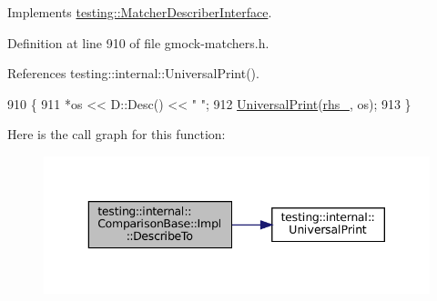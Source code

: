 Implements \hyperlink{classtesting_1_1MatcherDescriberInterface_ad9f861588bd969b6e3e717f13bb94e7b}{testing\+::\+Matcher\+Describer\+Interface}.



Definition at line 910 of file gmock-\/matchers.\+h.



References testing\+::internal\+::\+Universal\+Print().


\begin{DoxyCode}
910                                                   \{
911       *os << D::Desc() << \textcolor{stringliteral}{" "};
912       \hyperlink{namespacetesting_1_1internal_a30708fa2bacf11895b03bdb21eb72309}{UniversalPrint}(\hyperlink{classtesting_1_1internal_1_1ComparisonBase_1_1Impl_aa665caf1136e3a09f8019296ccbdea44}{rhs\_}, os);
913     \}
\end{DoxyCode}
Here is the call graph for this function\+:
\nopagebreak
\begin{figure}[H]
\begin{center}
\leavevmode
\includegraphics[width=343pt]{classtesting_1_1internal_1_1ComparisonBase_1_1Impl_a224bdd8f8196208d8138668dc74e1d27_cgraph}
\end{center}
\end{figure}
\mbox{\label{classtesting_1_1internal_1_1ComparisonBase_1_1Impl_a0608dbd0b2bfda7e450cbc5547aa6e4c}} 
